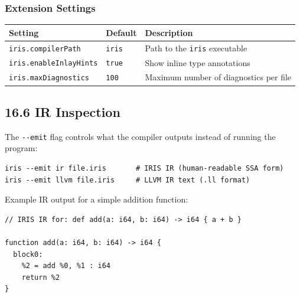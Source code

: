 \documentclass[
  english,
]{book}
\begin{document}
\subsubsection{Extension Settings}\label{extension-settings}

\begin{longtable}[]{@{}
  >{\raggedright\arraybackslash}p{}
  >{\raggedright\arraybackslash}p{}
  >{\raggedright\arraybackslash}p{}@{}}
\toprule\noalign{}
\begin{minipage}[b]{\linewidth}\raggedright
Setting
\end{minipage} & \begin{minipage}[b]{\linewidth}\raggedright
Default
\end{minipage} & \begin{minipage}[b]{\linewidth}\raggedright
Description
\end{minipage} \\
\midrule\noalign{}
\endhead
\bottomrule\noalign{}
\endlastfoot
\texttt{iris.compilerPath} & \texttt{iris} & Path to the \texttt{iris}
executable \\
\texttt{iris.enableInlayHints} & \texttt{true} & Show inline type
annotations \\
\texttt{iris.maxDiagnostics} & \texttt{100} & Maximum number of
diagnostics per file \\
\end{longtable}

\subsection{16.6 IR Inspection}\label{ir-inspection}

The \texttt{-\/-emit} flag controls what the compiler outputs instead of
running the program:

\begin{verbatim}
iris --emit ir file.iris       # IRIS IR (human-readable SSA form)
iris --emit llvm file.iris     # LLVM IR text (.ll format)
\end{verbatim}

Example IR output for a simple addition function:

\begin{verbatim}
// IRIS IR for: def add(a: i64, b: i64) -> i64 { a + b }

function add(a: i64, b: i64) -> i64 {
  block0:
    %2 = add %0, %1 : i64
    return %2
}
\end{verbatim}
\end{document}

